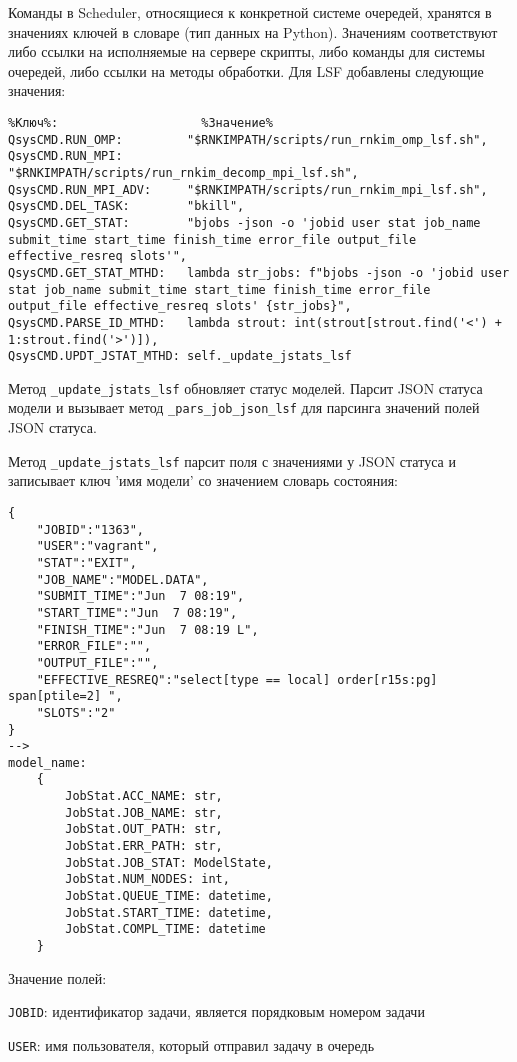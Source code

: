 Команды в Scheduler, относящиеся к конкретной системе очередей, хранятся в значениях ключей в словаре (тип данных на Python). Значениям соответствуют либо ссылки на исполняемые на сервере скрипты, либо команды для системы очередей, либо ссылки на методы обработки. Для LSF добавлены следующие значения:
\begin{lstlisting}
%Ключ%:                    %Значение%
QsysCMD.RUN_OMP:         "$RNKIMPATH/scripts/run_rnkim_omp_lsf.sh",
QsysCMD.RUN_MPI:         "$RNKIMPATH/scripts/run_rnkim_decomp_mpi_lsf.sh",
QsysCMD.RUN_MPI_ADV:     "$RNKIMPATH/scripts/run_rnkim_mpi_lsf.sh",
QsysCMD.DEL_TASK:        "bkill",
QsysCMD.GET_STAT:        "bjobs -json -o 'jobid user stat job_name submit_time start_time finish_time error_file output_file effective_resreq slots'",
QsysCMD.GET_STAT_MTHD:   lambda str_jobs: f"bjobs -json -o 'jobid user stat job_name submit_time start_time finish_time error_file output_file effective_resreq slots' {str_jobs}",
QsysCMD.PARSE_ID_MTHD:   lambda strout: int(strout[strout.find('<') + 1:strout.find('>')]),
QsysCMD.UPDT_JSTAT_MTHD: self._update_jstats_lsf
\end{lstlisting}

Метод \lstinline{_update_jstats_lsf} обновляет статус моделей. Парсит JSON статуса модели и вызывает метод \lstinline{_pars_job_json_lsf} для парсинга значений полей JSON статуса.

Метод \lstinline{_update_jstats_lsf} парсит поля с значениями у JSON статуса и записывает ключ 'имя модели' со значением словарь состояния:
\begin{lstlisting}
{
    "JOBID":"1363",
    "USER":"vagrant",
    "STAT":"EXIT",
    "JOB_NAME":"MODEL.DATA",
    "SUBMIT_TIME":"Jun  7 08:19",
    "START_TIME":"Jun  7 08:19",
    "FINISH_TIME":"Jun  7 08:19 L",
    "ERROR_FILE":"",
    "OUTPUT_FILE":"",
    "EFFECTIVE_RESREQ":"select[type == local] order[r15s:pg] span[ptile=2] ",
    "SLOTS":"2"
}
-->
model_name:
    {
        JobStat.ACC_NAME: str,
        JobStat.JOB_NAME: str,
        JobStat.OUT_PATH: str,
        JobStat.ERR_PATH: str,
        JobStat.JOB_STAT: ModelState,
        JobStat.NUM_NODES: int,
        JobStat.QUEUE_TIME: datetime,
        JobStat.START_TIME: datetime,
        JobStat.COMPL_TIME: datetime
    }
\end{lstlisting}

Значение полей:

\lstinline{JOBID}: идентификатор задачи, является порядковым номером задачи

\lstinline{USER}: имя пользователя, который отправил задачу в очередь

